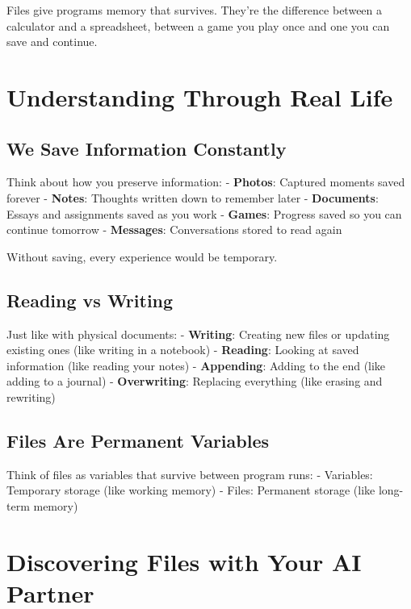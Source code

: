 \documentclass[
  letterpaper,
  DIV=11,
  numbers=noendperiod,
  oneside]{scrreprt}
\begin{document}
Files give programs memory that survives. They're the difference between
a calculator and a spreadsheet, between a game you play once and one you
can save and continue.

\section{Understanding Through Real
Life}\label{understanding-through-real-life-7}

\subsection{We Save Information
Constantly}\label{we-save-information-constantly}

Think about how you preserve information: - \textbf{Photos}: Captured
moments saved forever - \textbf{Notes}: Thoughts written down to
remember later - \textbf{Documents}: Essays and assignments saved as you
work - \textbf{Games}: Progress saved so you can continue tomorrow -
\textbf{Messages}: Conversations stored to read again

Without saving, every experience would be temporary.

\subsection{Reading vs Writing}\label{reading-vs-writing}

Just like with physical documents: - \textbf{Writing}: Creating new
files or updating existing ones (like writing in a notebook) -
\textbf{Reading}: Looking at saved information (like reading your notes)
- \textbf{Appending}: Adding to the end (like adding to a journal) -
\textbf{Overwriting}: Replacing everything (like erasing and rewriting)

\subsection{Files Are Permanent
Variables}\label{files-are-permanent-variables}

Think of files as variables that survive between program runs: -
Variables: Temporary storage (like working memory) - Files: Permanent
storage (like long-term memory)

\section{Discovering Files with Your AI
Partner}\label{discovering-files-with-your-ai-partner}
\end{document}
